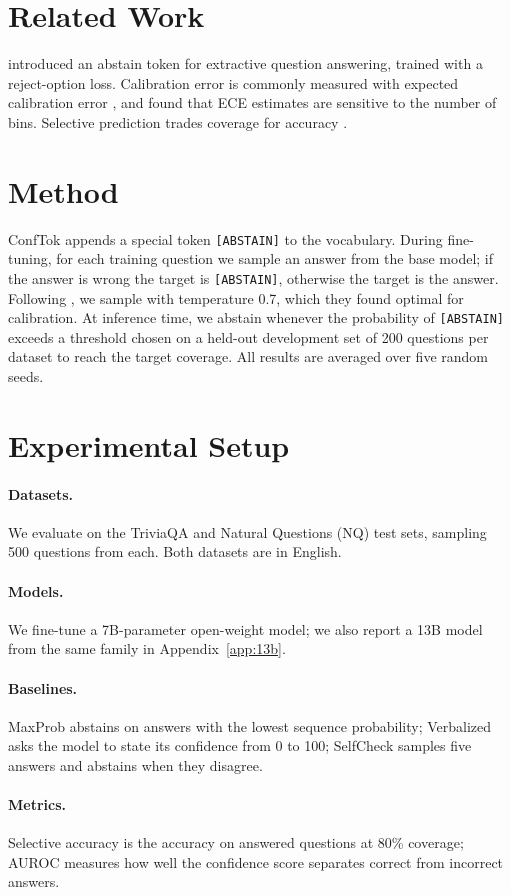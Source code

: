 \documentclass[11pt]{article}
\newcommand{\method}{ConfTok\xspace}
\newcommand{\abst}{\texttt{[ABSTAIN]}\xspace}
\begin{document}
\section{Related Work}
\citet{ito2020} introduced an abstain token for extractive question answering, trained with a reject-option loss.
Calibration error is commonly measured with expected calibration error \citep[ECE;][]{okafor2019}, and \citet{okafor2019} found that ECE estimates are sensitive to the number of bins.
Selective prediction trades coverage for accuracy \citep{aldana1998}.

\section{Method}
\method appends a special token \abst to the vocabulary.
During fine-tuning, for each training question we sample an answer from the base model; if the answer is wrong the target is \abst, otherwise the target is the answer.
Following \citet{park2022}, we sample with temperature 0.7, which they found optimal for calibration.
At inference time, we abstain whenever the probability of \abst exceeds a threshold chosen on a held-out development set of 200 questions per dataset to reach the target coverage.
All results are averaged over five random seeds.

\section{Experimental Setup}
\paragraph{Datasets.} We evaluate on the TriviaQA and Natural Questions (NQ) test sets, sampling 500 questions from each. Both datasets are in English.
\paragraph{Models.} We fine-tune a 7B-parameter open-weight model; we also report a 13B model from the same family in Appendix~\ref{app:13b}.
\paragraph{Baselines.} MaxProb abstains on answers with the lowest sequence probability; Verbalized asks the model to state its confidence from 0 to 100; SelfCheck samples five answers and abstains when they disagree.
\paragraph{Metrics.} Selective accuracy is the accuracy on answered questions at 80\% coverage; AUROC measures how well the confidence score separates correct from incorrect answers.
\end{document}
